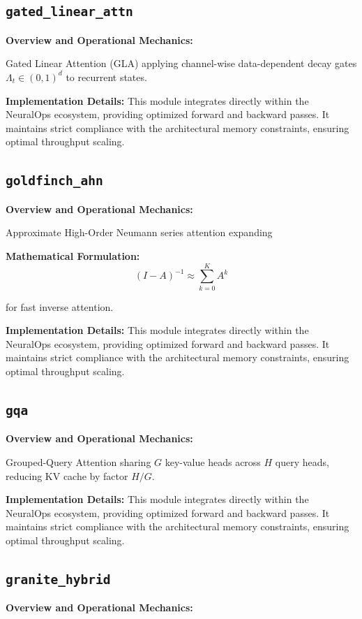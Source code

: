 \documentclass[10pt,twocolumn,letterpaper]{article}
\begin{document}
\subsection{\texttt{gated\_linear\_attn}}
\textbf{Overview and Operational Mechanics:}

Gated Linear Attention (GLA) applying channel-wise data-dependent decay gates $\Lambda_t \in (0, 1)^d$ to recurrent states.

\textbf{Implementation Details:}
This module integrates directly within the NeuralOps ecosystem, providing optimized forward and backward passes. It maintains strict compliance with the architectural memory constraints, ensuring optimal throughput scaling.

\subsection{\texttt{goldfinch\_ahn}}
\textbf{Overview and Operational Mechanics:}

Approximate High-Order Neumann series attention expanding

\textbf{Mathematical Formulation:}
\begin{equation}
(I - A)^{-1} \approx \sum_{k=0}^K A^k
\end{equation}

for fast inverse attention.

\textbf{Implementation Details:}
This module integrates directly within the NeuralOps ecosystem, providing optimized forward and backward passes. It maintains strict compliance with the architectural memory constraints, ensuring optimal throughput scaling.

\subsection{\texttt{gqa}}
\textbf{Overview and Operational Mechanics:}

Grouped-Query Attention sharing $G$ key-value heads across $H$ query heads, reducing KV cache by factor $H/G$.

\textbf{Implementation Details:}
This module integrates directly within the NeuralOps ecosystem, providing optimized forward and backward passes. It maintains strict compliance with the architectural memory constraints, ensuring optimal throughput scaling.

\subsection{\texttt{granite\_hybrid}}
\textbf{Overview and Operational Mechanics:}
\end{document}
